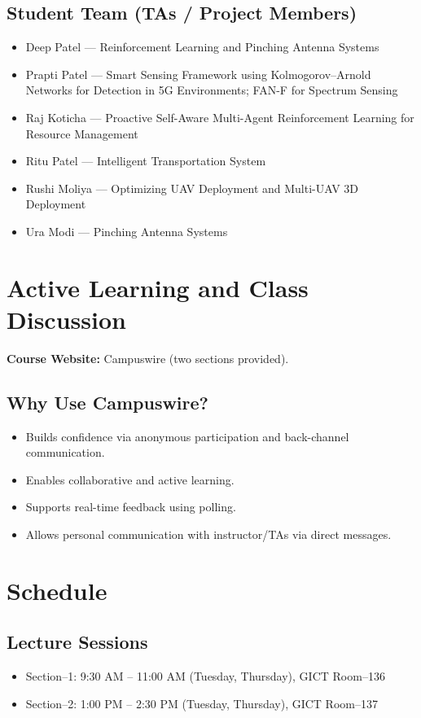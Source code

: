 \documentclass[11pt]{article}
\begin{document}
\subsection*{Student Team (TAs / Project Members)}
\begin{itemize}
    \item Deep Patel --- Reinforcement Learning and Pinching Antenna Systems
    \item Prapti Patel --- Smart Sensing Framework using Kolmogorov--Arnold Networks for Detection in 5G Environments; FAN-F for Spectrum Sensing
    \item Raj Koticha --- Proactive Self-Aware Multi-Agent Reinforcement Learning for Resource Management
    \item Ritu Patel --- Intelligent Transportation System
    \item Rushi Moliya --- Optimizing UAV Deployment and Multi-UAV 3D Deployment
    \item Ura Modi --- Pinching Antenna Systems
\end{itemize}

\section{Active Learning and Class Discussion}

\textbf{Course Website:} Campuswire (two sections provided).

\subsection*{Why Use Campuswire?}
\begin{itemize}
    \item Builds confidence via anonymous participation and back-channel communication.
    \item Enables collaborative and active learning.
    \item Supports real-time feedback using polling.
    \item Allows personal communication with instructor/TAs via direct messages.
\end{itemize}

\section{Schedule}

\subsection*{Lecture Sessions}
\begin{itemize}
    \item Section--1: 9:30 AM -- 11:00 AM (Tuesday, Thursday), GICT Room--136
    \item Section--2: 1:00 PM -- 2:30 PM (Tuesday, Thursday), GICT Room--137
\end{itemize}
\end{document}
